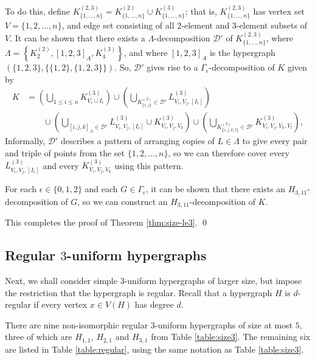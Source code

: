 To do this, define $K_{\{1,\ldots,n\}}^{(2,3)} = K_{\{1,\ldots,n\}}^{(2)} \cup K_{\{1,\ldots,n\}}^{(3)}$; that is, $K_{\{1,\ldots,n\}}^{(2,3)}$ has vertex set $V = \{1,2,\ldots,n\}$, and edge set consisting of all $2$-element and $3$-element subsets of $V$.
It can be shown that there exists a $\Lambda$-decomposition $\mathcal{D}'$ of $K_{\{1,\ldots,n\}}^{(2,3)}$,
where $\Lambda = \left\{ K_{2}^{(2)}, [1,2,3]_A, K_{4}^{(3)} \right\}$, and where $[1,2,3]_A$ is the hypergraph $(\{1,2,3\}, \{\{1,2\},\{1,2,3\}\})$.
So, $\mathcal{D}'$ gives rise to a $\Gamma_\epsilon$-decomposition of $K$ given by
\begin{align*}
    K &= \left( \bigcup_{1 \leq i \leq n} K_{V_i \cup I_\epsilon}^{(3)} \right)
    \cup \left( \bigcup_{K_{\{i,j\}}^{(2)} \in \mathcal{D}'} L_{V_i,V_j,[I_\epsilon]}^{(3)} \right)
    \\ & \quad \quad
    \cup \left( \bigcup_{[i,j,k]_A \in \mathcal{D}'} L_{V_i,V_j,[I_\epsilon]}^{(3)} \cup K_{V_i,V_j,V_k}^{(3)} \right)
    \cup \left( \bigcup_{K_{\{i,j,k,l\}}^{(3)} \in \mathcal{D}'} K_{V_i,V_j,V_k,V_l}^{(3)} \right),
\end{align*}
Informally, $\mathcal{D}'$ describes a pattern of arranging copies of $L \in \Lambda$ to give every pair and triple of points from the set $\{1,2,\ldots,n\}$,
so we can therefore cover every $L_{V_i, V_j, [I_\epsilon]}^{(3)}$ and every $K_{V_i, V_j, V_k}^{(3)}$ using this pattern.

For each $\epsilon \in \{0,1,2\}$ and each $G \in \Gamma_\epsilon$, it can be shown that there exists an $H_{3,11}$-decomposition of $G$,
so we can construct an $H_{3,11}$-decomposition of $K$.

This completes the proof of Theorem \ref{thm:size-le3}. \qed

\subsection{Regular $3$-uniform hypergraphs}

Next, we shall consider simple $3$-uniform hypergraphs of larger size, but impose the restriction that the hypergraph is regular.
Recall that a hypergraph $H$ is $d$-regular if every vertex $x \in V(H)$ has degree $d$.

There are nine non-isomorphic regular $3$-uniform hypergraphs of size at most $5$, three of which are $H_{1,1}$, $H_{2,1}$ and $H_{3,1}$ from Table \ref{table:size3}.
The remaining six are listed in Table \ref{table:regular}, using the same notation as Table \ref{table:size3}.

